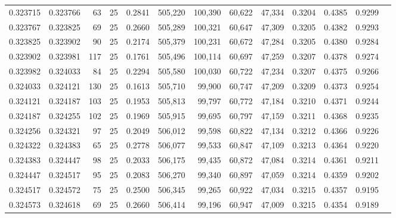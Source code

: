 \begin{tabular}{rrrrrrrrrrrrr}
0.323715 & 0.323766 &    63 &  25 &                                     0.2841 & 505,220 & 100,390 &  60,622 &  47,334 & 0.3204 & 0.4385 & 0.9299 \\
0.323767 & 0.323825 &    69 &  25 &                                     0.2660 & 505,289 & 100,321 &  60,647 &  47,309 & 0.3205 & 0.4382 & 0.9293 \\
0.323825 & 0.323902 &    90 &  25 &                                     0.2174 & 505,379 & 100,231 &  60,672 &  47,284 & 0.3205 & 0.4380 & 0.9284 \\
0.323902 & 0.323981 &   117 &  25 &                                     0.1761 & 505,496 & 100,114 &  60,697 &  47,259 & 0.3207 & 0.4378 & 0.9274 \\
0.323982 & 0.324033 &    84 &  25 &                                     0.2294 & 505,580 & 100,030 &  60,722 &  47,234 & 0.3207 & 0.4375 & 0.9266 \\
0.324033 & 0.324121 &   130 &  25 &                                     0.1613 & 505,710 &  99,900 &  60,747 &  47,209 & 0.3209 & 0.4373 & 0.9254 \\
0.324121 & 0.324187 &   103 &  25 &                                     0.1953 & 505,813 &  99,797 &  60,772 &  47,184 & 0.3210 & 0.4371 & 0.9244 \\
0.324187 & 0.324255 &   102 &  25 &                                     0.1969 & 505,915 &  99,695 &  60,797 &  47,159 & 0.3211 & 0.4368 & 0.9235 \\
0.324256 & 0.324321 &    97 &  25 &                                     0.2049 & 506,012 &  99,598 &  60,822 &  47,134 & 0.3212 & 0.4366 & 0.9226 \\
0.324322 & 0.324383 &    65 &  25 &                                     0.2778 & 506,077 &  99,533 &  60,847 &  47,109 & 0.3213 & 0.4364 & 0.9220 \\
0.324383 & 0.324447 &    98 &  25 &                                     0.2033 & 506,175 &  99,435 &  60,872 &  47,084 & 0.3214 & 0.4361 & 0.9211 \\
0.324447 & 0.324517 &    95 &  25 &                                     0.2083 & 506,270 &  99,340 &  60,897 &  47,059 & 0.3214 & 0.4359 & 0.9202 \\
0.324517 & 0.324572 &    75 &  25 &                                     0.2500 & 506,345 &  99,265 &  60,922 &  47,034 & 0.3215 & 0.4357 & 0.9195 \\
0.324573 & 0.324618 &    69 &  25 &                                     0.2660 & 506,414 &  99,196 &  60,947 &  47,009 & 0.3215 & 0.4354 & 0.9189 \\

\end{tabular}
